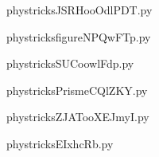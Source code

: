     \newcommand{\CaptionFigJSRHooOdlPDT}{<+Type your caption here+>}
    \begin{center}
        
    \end{center}
    phystricksJSRHooOdlPDT.py

    

    \clearpage
    


    \newcommand{\CaptionFigfigureNPQwFTp}{<+Type your caption here+>}
    \begin{center}
        
    \end{center}
    phystricksfigureNPQwFTp.py

    

    \clearpage
    


    \newcommand{\CaptionFigSUCoowlFdp}{<+Type your caption here+>}
    \begin{center}
        
    \end{center}
    phystricksSUCoowlFdp.py

    

    \clearpage
    


    \newcommand{\CaptionFigPrismeCQlZKY}{<+Type your caption here+>}
    \begin{center}
        
    \end{center}
    phystricksPrismeCQlZKY.py

    

    \clearpage
    


    \newcommand{\CaptionFigZJATooXEJmyI}{<+Type your caption here+>}
    \begin{center}
        
    \end{center}
    phystricksZJATooXEJmyI.py

    

    \clearpage
    


    \newcommand{\CaptionFigEIxhcRb}{<+Type your caption here+>}
    \begin{center}
        
    \end{center}
    phystricksEIxhcRb.py

